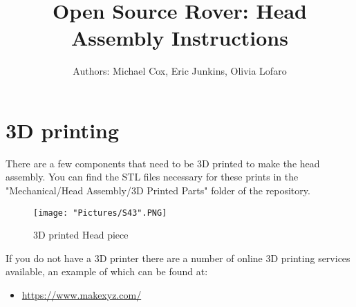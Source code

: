 \documentclass{article}
\begin{document}
\newcommand\partimg{\includegraphics[width=2cm,height=1.25cm,keepaspectratio]}


\title{Open Source Rover: Head Assembly Instructions}
\author{Authors: Michael Cox, Eric Junkins, Olivia Lofaro}

\makeatletter
\def\@maketitle{
\begin{center}
	\makebox[\textwidth][c]{ \texttt{[image: "Pictures/finala".png]}}
	{\Huge \bfseries \sffamily \@title }\\[3ex]
	{\Large \sffamily \@author}\\[3ex]
	\texttt{[image: "Pictures/JPL logo".png]}
\end{center}}
\makeatother

\maketitle



\newpage


\tableofcontents

\newpage

\section{3D printing}
There are a few components that need to be 3D printed to make the head assembly. You can find the STL files necessary for these prints in the "Mechanical/Head Assembly/3D Printed Parts" folder of the repository.

\begin{figure}[H]
	\centering
	\texttt{[image: "Pictures/S43".PNG]}
	\caption{3D printed Head piece}
\end{figure}


If you do not have a 3D printer there are a number of online 3D printing services available, an example of which can be found at:

\begin{itemize}
	\item \href{https://www.makexyz.com/}{https://www.makexyz.com/}
\end{itemize}
\end{document}
